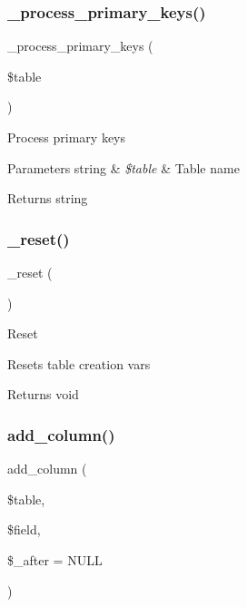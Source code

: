 \subsubsection{\texorpdfstring{\+\_\+process\+\_\+primary\+\_\+keys()}{\_process\_primary\_keys()}}
{\footnotesize\ttfamily \+\_\+process\+\_\+primary\+\_\+keys (\begin{DoxyParamCaption}\item[{}]{\$table }\end{DoxyParamCaption})\hspace{0.3cm}{\ttfamily [protected]}}

Process primary keys


\begin{DoxyParams}[1]{Parameters}
string & {\em \$table} & Table name \\
\hline
\end{DoxyParams}
\begin{DoxyReturn}{Returns}
string 
\end{DoxyReturn}
\mbox{\label{class_c_i___d_b__forge_ab90fa1f6f390913fed8670e6535dc180}} 
\subsubsection{\texorpdfstring{\+\_\+reset()}{\_reset()}}
{\footnotesize\ttfamily \+\_\+reset (\begin{DoxyParamCaption}{ }\end{DoxyParamCaption})\hspace{0.3cm}{\ttfamily [protected]}}

Reset

Resets table creation vars

\begin{DoxyReturn}{Returns}
void 
\end{DoxyReturn}
\mbox{\label{class_c_i___d_b__forge_a855261dcf98c0cf401aa469994919c51}} 
\subsubsection{\texorpdfstring{add\+\_\+column()}{add\_column()}}
{\footnotesize\ttfamily add\+\_\+column (\begin{DoxyParamCaption}\item[{}]{\$table,  }\item[{}]{\$field,  }\item[{}]{\$\+\_\+after = {\ttfamily NULL} }\end{DoxyParamCaption})}

